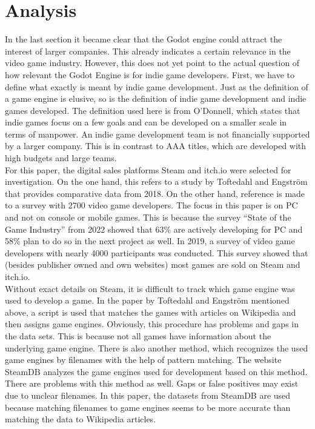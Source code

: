 \section{Analysis}
In the last section it became clear that the Godot engine could attract the interest of larger companies.
This already indicates a certain relevance in the video game industry.
However, this does not yet point to the actual question of how relevant the Godot Engine is for indie game developers.
First, we have to define what exactly is meant by indie game development.
Just as the definition of a game engine is elusive, so is the definition of indie game development and indie games developed.
The definition used here is from O'Donnell, which states that indie games focus on a few goals and can be developed on a smaller scale in terms of manpower\cite{indie-definition}.
An indie game development team is not financially supported by a larger company.
This is in contrast to AAA titles, which are developed with high budgets and large teams.\\

For this paper, the digital sales platforms Steam and itch.io were selected for investigation.
On the one hand, this refers to a study by Toftedahl and Engström that provides comparative data from 2018\cite{game-engine-taxonomy}.
On the other hand, reference is made to a survey with 2700 video game developers.
The focus in this paper is on PC and not on console or mobile games.
This is because the survey ``State of the Game Industry'' from 2022 showed that 63\% are actively developing for PC and 58\% plan to do so in the next project as well\cite{gdc-2022}.
In 2019, a survey of video game developers with nearly 4000 participants\cite{gdc-2019} was conducted.
This survey showed that (besides publisher owned and own websites) most games are sold on Steam and itch.io.\\

Without exact details on Steam, it is difficult to track which game engine was used to develop a game.
In the paper by Toftedahl and Engström mentioned above, a script is used that matches the games with articles on Wikipedia and then assigns game engines.
Obviously, this procedure has problems and gaps in the data sets.
This is because not all games have information about the underlying game engine.
There is also another method, which recognizes the used game engines by filenames with the help of pattern matching.
The website SteamDB analyzes the game engines used for development based on this method\cite{steamdb-tech}.
There are problems with this method as well.
Gaps or false positives may exist due to unclear filenames.
In this paper, the datasets from SteamDB are used because matching filenames to game engines seems to be more accurate than matching the data to Wikipedia articles.\\

